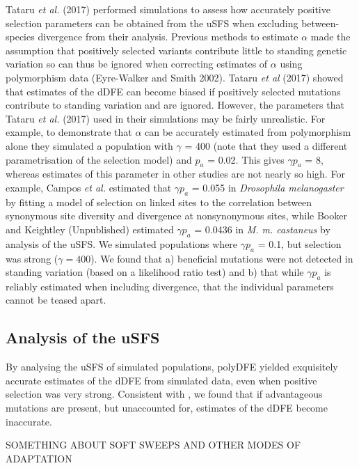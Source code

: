Tataru \textit{et al.} (2017) performed simulations to assess how accurately positive selection parameters can be obtained from the uSFS when excluding between-species divergence from their analysis. Previous methods to estimate $\alpha$ made the assumption that positively selected variants contribute little  to standing genetic variation so can thus be ignored when correcting estimates of $\alpha$ using polymorphism data (Eyre-Walker and Smith 2002). Tataru \textit{et al} (2017) showed  that estimates of the dDFE can become biased if positively selected mutations contribute to standing variation and are ignored. However, the parameters that Tataru \textit{et al.} (2017) used in their simulations may be fairly unrealistic. For example, to demonstrate that $\alpha$ can be accurately estimated from polymorphism alone they simulated a population with $\gamma$ = 400 (note that they used a different parametrisation of the selection model) and $p_a$ = 0.02. This gives $\gamma p_a$ = 8, whereas estimates of this parameter in other studies are not nearly so high. For example, Campos \textit{et al.} estimated that $\gamma p_a$ = 0.055 in \textit{Drosophila melanogaster} by fitting a model of selection on linked sites to the correlation between synonymous site diversity and divergence at nonsynonymous sites, while Booker and Keightley (Unpublished) estimated $\gamma p_a$ = 0.0436 in \textit{M. m. castaneus} by analysis of the uSFS. We simulated populations where $\gamma p_a$ = 0.1, but selection was strong ($\gamma = 400$). We found that a) beneficial mutations were not detected in standing variation (based on a likelihood ratio test) and b) that while $\gamma p_a$ is reliably estimated when including divergence, that the individual parameters cannot be teased apart. 

\subsection{Analysis of the uSFS}

By analysing the uSFS of simulated populations, polyDFE yielded exquisitely accurate estimates of the dDFE from simulated data, even when positive selection was very strong. Consistent with \cite{RN354}, we found that if advantageous mutations are present, but unaccounted for, estimates of the dDFE become inaccurate. 


SOMETHING ABOUT SOFT SWEEPS AND OTHER MODES OF ADAPTATION

